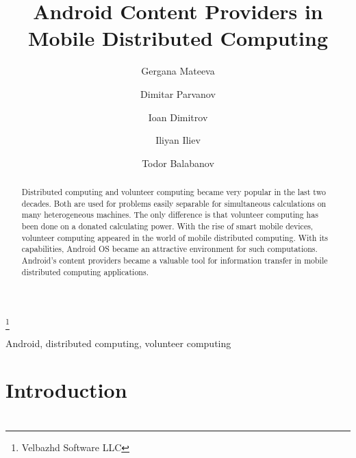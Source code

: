 \documentclass{ifacconf}
\begin{document}
\begin{frontmatter}

\title{Android Content Providers in Mobile Distributed Computing } 

\thanks[footnoteinfo]{Velbazhd Software LLC}

\author[First]{Gergana Mateeva} 
\author[First]{Dimitar Parvanov} 
\author[Second]{Ioan Dimitrov} 
\author[First]{Iliyan Iliev}
\author[First]{Todor Balabanov} 

\address[First]{Bulgarian Academy of Sciences\\Institute of Information and Communication Technologies\\acad. Georgi Bonchev Str., block 2, 1113 Sofia, Bulgaria\\(gergana.mateeva, dimitar.parvanov, iliyan.iliev, todor.balabanov) @iict.bas.bg}
\address[Second]{Technical University of Sofia\\Faculty of Electronic Engineering and Technology\\8 St. Kliment Ohridski Blvd., block 1, 1756 Sofia, Bulgaria\\joancdimitrov@tu-sofia.bg}

\begin{abstract}
Distributed computing and volunteer computing became very popular in the last two decades. Both are used for problems easily separable for simultaneous calculations on many heterogeneous machines. The only difference is that volunteer computing has been done on a donated calculating power. With the rise of smart mobile devices, volunteer computing appeared in the world of mobile distributed computing. With its capabilities, Android OS became an attractive environment for such computations. Android's content providers became a valuable tool for information transfer in mobile distributed computing applications. 
\end{abstract}

\begin{keyword}
Android, distributed computing, volunteer computing
\end{keyword}

\end{frontmatter}

\section{Introduction}

\section{}
\end{document}
